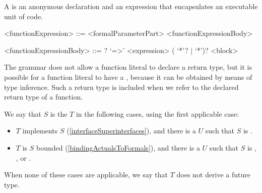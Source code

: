 \documentclass[makeidx]{article}
\begin{document}
{\LMHash{}%
A 
is an anonymous declaration and an expression
that encapsulates an executable unit of code.

\begin{grammar}
<functionExpression> ::= <formalParameterPart> <functionExpressionBody>

<functionExpressionBody> ::= \ASYNC? `=>' <expression>
  \alt (\ASYNC{} `*'? | \SYNC{} `*')? <block>
\end{grammar}

\LMHash{}%
The grammar does not allow a function literal to declare a return type,
but it is possible for a function literal to have a
,
because it can be obtained by means of type inference.
Such a return type is included
when we refer to the declared return type of a function.


\LMHash{}%
We say that $S$ is the
$T$ in the following cases, using the first applicable case:

\begin{itemize}
\item $T$ implements $S$
  (\ref{interfaceSuperinterfaces}),
  and there is a $U$ such that $S$ is .
\item $T$ is $S$ bounded
  (\ref{bindingActualsToFormals}),
  and there is a $U$ such that
  $S$ is , , or .
\end{itemize}

\LMHash{}%
When none of these cases are applicable,
we say that $T$ does not derive a future type.

}
\end{document}
